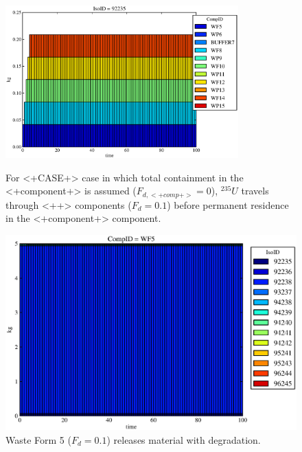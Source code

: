 \begin{figure}[ht]
\centering
\includegraphics[width=0.8\textwidth]{./chapters/demonstration/no_release/lpDMII.eps}
\caption[$^{235}U$ residence. Lumped Parameter  <+Component+> No Release.]{
For <+CASE+> case in which total containment in the <+component+> is assumed 
($F_{d,<+comp+>}=0$), $^{235}U$ travels through <++> components ($F_d = 0.1$) before 
permanent residence in the <+component+> component.
}
\label{fig:lpDMIIall}
\begin{minipage}[b]{0.45\linewidth}

  \includegraphics[width=\textwidth]{./chapters/demonstration/no_release/lpDMII1.eps}
  \caption[LPDMII Waste Form Contaminants.]{
    Waste Form 5 ($F_d = 0.1$) releases material with degradation. 
    }
  \label{fig:lpDMIIwf5}
  

\end{minipage}
\end{figure}

